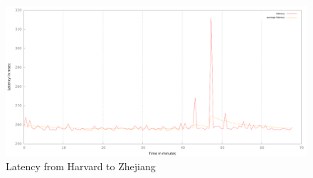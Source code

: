 \documentclass[paper=a4, fontsize=11pt]{scrartcl} %
\numberwithin{equation}{section} %
\numberwithin{figure}{section} %
\numberwithin{table}{section} %
\begin{document}
\begin{figure}[h!]
\includegraphics[width=\columnwidth]{latency_harvard_zhejiang.pdf}
\caption{Latency from Harvard to Zhejiang}
\end{figure}

\end{document}
